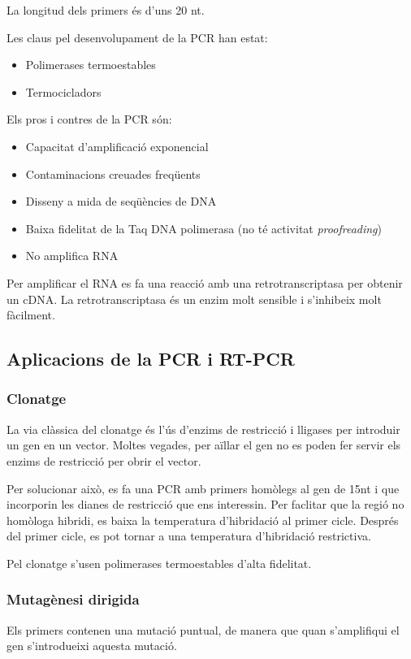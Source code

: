 La longitud dels primers és d'uns 20 nt.

Les claus pel desenvolupament de la PCR han estat:
\begin{itemize}
\item Polimerases termoestables
\item Termocicladors
\end{itemize}

Els pros i contres de la PCR són:
\begin{itemize}
\item Capacitat d'amplificació exponencial
\item Contaminacions creuades freqüents
\item Disseny a mida de seqüències de DNA
\item Baixa fidelitat de la Taq DNA polimerasa (no té activitat \textit{proofreading})
\item No amplifica RNA
\end{itemize}

Per amplificar el RNA es fa una reacció amb una retrotranscriptasa per obtenir un cDNA. La retrotranscriptasa és un enzim molt sensible i s'inhibeix molt fàcilment.

\subsection{Aplicacions de la PCR i RT-PCR}

\subsubsection{Clonatge}
La via clàssica del clonatge és l'ús d'enzims de restricció i lligases per introduir un gen en un vector. Moltes vegades, per aïllar el gen no es poden fer servir els enzims de restricció per obrir el vector.

Per solucionar això, es fa una PCR amb primers homòlegs al gen de 15nt i que incorporin les dianes de restricció que ens interessin. Per faclitar que la regió no homòloga hibridi, es baixa la temperatura d'hibridació al primer cicle. Després del primer cicle, es pot tornar a una temperatura d'hibridació restrictiva.

Pel clonatge s'usen polimerases termoestables d'alta fidelitat.

\subsubsection{Mutagènesi dirigida}
Els primers contenen una mutació puntual, de manera que quan s'amplifiqui el gen s'introdueixi aquesta mutació.

